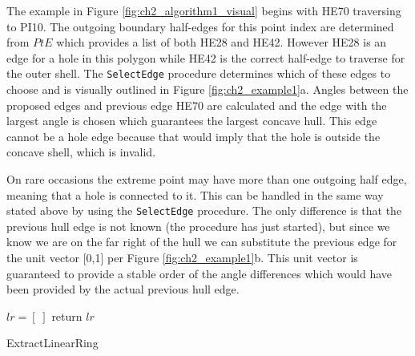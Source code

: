 The example in Figure \ref{fig:ch2_algorithm1_visual} begins with HE70 traversing to PI10. The outgoing boundary half-edges for this point index are determined from $PtE$ which provides a list of both HE28 and HE42. However HE28 is an edge for a hole in this polygon while HE42 is the correct half-edge to traverse for the outer shell. The \texttt{SelectEdge} procedure determines which of these edges to choose and is visually outlined in Figure \ref{fig:ch2_example1}a. Angles between the proposed edges and previous edge HE70 are calculated and the edge with the largest angle is chosen which guarantees the largest concave hull.  This edge cannot be a hole edge because that would imply that the hole is outside the concave shell, which is invalid.

On rare occasions the extreme point may have more than one outgoing half edge, meaning that a hole is connected to it.  This can be handled in the same way stated above by using the \texttt{SelectEdge} procedure. The only difference is that the previous hull edge is not known (the procedure has just started), but since we know we are on the far right of the hull we can substitute the previous edge for the unit vector [0,1] per Figure \ref{fig:ch2_example1}b. This unit vector is guaranteed to provide a stable order of the angle differences which would have been provided by the actual previous hull edge.

\begin{algorithm}

    $lr = [\;]$  
    return $lr$
    \caption[Extract Linear Ring]{ExtractLinearRing}\label{alg:ch2_concave_hull_shell}
\end{algorithm}



